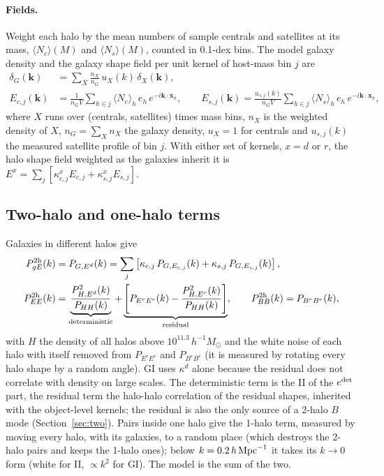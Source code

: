 \documentclass[11pt]{article}
\newcommand{\hMpc}{\,h\,{\rm Mpc}^{-1}}
\newcommand{\Msun}{\,h^{-1}M_\odot}
\newcommand{\Nc}{\langle N_c\rangle}
\newcommand{\Ns}{\langle N_s\rangle}
\newcommand{\Kone}{0.2}         %
\newcommand{\Mcomp}{11.3}       %
\newcommand{\dlgM}{0.1}         %
\begin{document}
\paragraph{Fields.} Weight each halo by the mean numbers of sample centrals
and satellites at its mass, $\Nc(M)$ and $\Ns(M)$, counted in
\dlgM-dex bins. The model galaxy density and the galaxy shape field per
unit kernel of host-mass bin $j$ are
\begin{align}
\delta_G(\mathbf k) &= \sum_X \frac{n_X}{n_G}\,u_X(k)\,\delta_X(\mathbf k),\\
E_{c,j}(\mathbf k) &= \frac{1}{n_G V}\sum_{h\in j}\Nc_h\,e_h\,e^{-i\mathbf k\cdot\mathbf x_h},\qquad
E_{s,j}(\mathbf k) = \frac{u_{s,j}(k)}{n_G V}\sum_{h\in j}\Ns_h\,e_h\,e^{-i\mathbf k\cdot\mathbf x_h},
\end{align}
where $X$ runs over (centrals, satellites) times mass bins, $n_X$ is the
weighted density of $X$, $n_G=\sum_X n_X$ the galaxy density, $u_X=1$ for
centrals and $u_{s,j}(k)$ the measured satellite profile of bin $j$. With
either set of kernels, $x=d$ or $r$, the halo shape field weighted as the
galaxies inherit it is $E^x=\sum_j[\kappa^x_{c,j}E_{c,j}+\kappa^x_{s,j}E_{s,j}]$.

\subsection{Two-halo and one-halo terms}

Galaxies in different halos give
\begin{align}
P_{gE}^{\rm 2h}(k) &= P_{G,E^d}(k) = \sum_j \left[\kappa_{c,j}\,P_{G,E_{c,j}}(k) + \kappa_{s,j}\,P_{G,E_{s,j}}(k)\right],
\label{eq:gi}\\
P_{EE}^{\rm 2h}(k) &= \underbrace{\frac{P_{H,E^d}^2(k)}{P_{HH}(k)}}_{\rm deterministic}
+\underbrace{\left[P_{E^rE^r}(k)-\frac{P_{H,E^r}^2(k)}{P_{HH}(k)}\right]}_{\rm residual},
\qquad P_{BB}^{\rm 2h}(k)=P_{B^rB^r}(k),
\label{eq:ii}
\end{align}
with $H$ the density of all halos above $10^{\Mcomp}\Msun$ and the white
noise of each halo with itself removed from $P_{E^rE^r}$ and $P_{B^rB^r}$
(it is measured by rotating every halo shape by a random angle). GI uses
$\kappa^d$ alone because the residual does not correlate with density on
large scales. The deterministic term is the II of the $e^{\rm det}$ part,
the residual term the halo-halo correlation of the residual shapes,
inherited with the object-level kernels; the residual is also the only
source of a 2-halo $B$ mode (Section~\ref{sec:two}). Pairs inside
one halo give the 1-halo term, measured by moving every halo, with its
galaxies, to a random place (which destroys the 2-halo pairs and keeps
the 1-halo ones); below $k=\Kone\hMpc$ it takes its $k\to0$ form (white
for II, $\propto k^2$ for GI). The model is the sum of the two.
\end{document}
